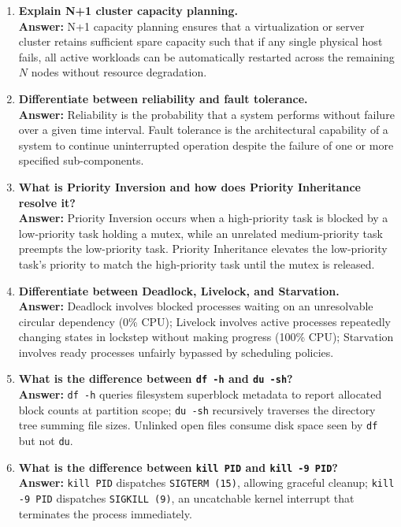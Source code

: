 \begin{enumerate}[label=\textbf{Q\arabic*.},leftmargin=1.2cm]
\item \textbf{Explain N+1 cluster capacity planning.} \\
\textbf{Answer:} N+1 capacity planning ensures that a virtualization or server cluster retains sufficient spare capacity such that if any single physical host fails, all active workloads can be automatically restarted across the remaining $N$ nodes without resource degradation.

\item \textbf{Differentiate between reliability and fault tolerance.} \\
\textbf{Answer:} Reliability is the probability that a system performs without failure over a given time interval. Fault tolerance is the architectural capability of a system to continue uninterrupted operation despite the failure of one or more specified sub-components.

\item \textbf{What is Priority Inversion and how does Priority Inheritance resolve it?} \\
\textbf{Answer:} Priority Inversion occurs when a high-priority task is blocked by a low-priority task holding a mutex, while an unrelated medium-priority task preempts the low-priority task. Priority Inheritance elevates the low-priority task's priority to match the high-priority task until the mutex is released.

\item \textbf{Differentiate between Deadlock, Livelock, and Starvation.} \\
\textbf{Answer:} Deadlock involves blocked processes waiting on an unresolvable circular dependency (0\% CPU); Livelock involves active processes repeatedly changing states in lockstep without making progress (100\% CPU); Starvation involves ready processes unfairly bypassed by scheduling policies.

\item \textbf{What is the difference between \texttt{df -h} and \texttt{du -sh}?} \\
\textbf{Answer:} \texttt{df -h} queries filesystem superblock metadata to report allocated block counts at partition scope; \texttt{du -sh} recursively traverses the directory tree summing file sizes. Unlinked open files consume disk space seen by \texttt{df} but not \texttt{du}.

\item \textbf{What is the difference between \texttt{kill PID} and \texttt{kill -9 PID}?} \\
\textbf{Answer:} \texttt{kill PID} dispatches \texttt{SIGTERM (15)}, allowing graceful cleanup; \texttt{kill -9 PID} dispatches \texttt{SIGKILL (9)}, an uncatchable kernel interrupt that terminates the process immediately.


\end{enumerate}
